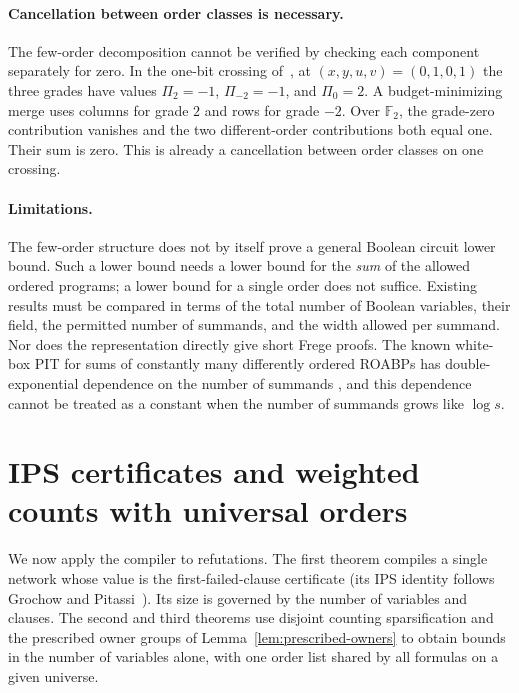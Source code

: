 \documentclass[11pt]{article}
\theoremstyle{definition}
\theoremstyle{remark}
\begin{document}
\paragraph{Cancellation between order classes is necessary.}
The few-order decomposition cannot be verified by checking each
component separately for zero. In the one-bit crossing of~\cite{Cruz26},
at $(x,y,u,v)=(0,1,0,1)$ the three grades have values
$\Pi_2=-1$, $\Pi_{-2}=-1$, and $\Pi_0=2$. A budget-minimizing merge
uses columns for grade $2$ and rows for grade $-2$. Over
$\mathbb F_2$, the grade-zero contribution vanishes and the two
different-order contributions both equal one. Their sum is zero.
This is already a cancellation between order classes on one crossing.

\paragraph{Limitations.}
The few-order structure does not by itself prove a general Boolean
circuit lower bound. Such a lower bound needs a lower bound for the
\emph{sum} of the allowed ordered programs; a lower bound for a single
order does not suffice. Existing results must be
compared in terms of the total number of Boolean variables, their field,
the permitted number of summands, and the width allowed per summand.
Nor does the representation directly give short Frege proofs. The
known white-box PIT for sums of constantly many differently ordered
ROABPs has double-exponential dependence on the number of summands
\cite[Theorem~3.2]{GKST15}, and this dependence cannot be treated as
a constant when the number of summands grows like $\log s$.


\section{IPS certificates and weighted counts with universal orders}
\label{sec:ips-universal}

We now apply the compiler to refutations. The first theorem compiles a
single network whose value is the first-failed-clause certificate
(its IPS identity follows Grochow and Pitassi~\cite{GP18}). Its size
is governed by the number of variables and clauses. The second and third theorems use disjoint
counting sparsification and the prescribed owner groups of
Lemma~\ref{lem:prescribed-owners} to obtain bounds in the number of
variables alone, with one order list shared by all formulas on a
given universe.
\end{document}
